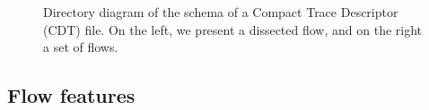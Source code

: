 \begin{figure}
\centering
{}
\caption{Directory diagram of the schema of a Compact Trace Descriptor (CDT) file. On the left, we present a dissected flow, and on the right a set of flows.}
\label{fig:CTD-diagram}
\end{figure}


\subsection{Flow features}

